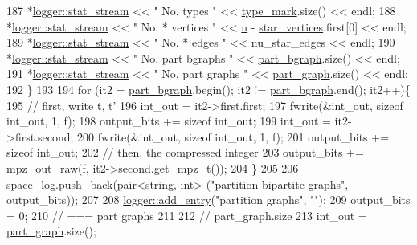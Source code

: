 \begin{DoxyCode}
187     *\hyperlink{classlogger_a7db37821f875f2ba3540980b355779f5}{logger::stat\_stream} << \textcolor{stringliteral}{" No. types         "} << 
      \hyperlink{classmarked__graph__compressed_a86b00223525703e973415cbc9c94da68}{type\_mark}.size() << endl;
188     *\hyperlink{classlogger_a7db37821f875f2ba3540980b355779f5}{logger::stat\_stream} << \textcolor{stringliteral}{" No. * vertices    "} << \hyperlink{classmarked__graph__compressed_a8d841016ddb11cfd33748c8deb6277ba}{n} - 
      \hyperlink{classmarked__graph__compressed_a7a4ced4586e2e353f9076bd447df5208}{star\_vertices}.first[0] << endl;
189     *\hyperlink{classlogger_a7db37821f875f2ba3540980b355779f5}{logger::stat\_stream} << \textcolor{stringliteral}{" No. * edges       "} << nu\_star\_edges << endl;
190     *\hyperlink{classlogger_a7db37821f875f2ba3540980b355779f5}{logger::stat\_stream} << \textcolor{stringliteral}{" No. part bgraphs  "} << 
      \hyperlink{classmarked__graph__compressed_a7b3267063fba30b45eb21b3ba4e07536}{part\_bgraph}.size() << endl;
191     *\hyperlink{classlogger_a7db37821f875f2ba3540980b355779f5}{logger::stat\_stream} << \textcolor{stringliteral}{" No. part graphs   "} << 
      \hyperlink{classmarked__graph__compressed_ae179a4737e6eab905c18a94d44ef64b7}{part\_graph}.size() << endl;
192   \}
193 
194   \textcolor{keywordflow}{for} (it2 = \hyperlink{classmarked__graph__compressed_a7b3267063fba30b45eb21b3ba4e07536}{part\_bgraph}.begin(); it2 != \hyperlink{classmarked__graph__compressed_a7b3267063fba30b45eb21b3ba4e07536}{part\_bgraph}.end(); it2++)\{
195     \textcolor{comment}{// first, write t, t'}
196     int\_out = it2->first.first;
197     fwrite(&int\_out, \textcolor{keyword}{sizeof} int\_out, 1, f);
198     output\_bits += \textcolor{keyword}{sizeof} int\_out;
199     int\_out = it2->first.second;
200     fwrite(&int\_out, \textcolor{keyword}{sizeof} int\_out, 1, f);
201     output\_bits += \textcolor{keyword}{sizeof} int\_out;
202     \textcolor{comment}{// then, the compressed integer}
203     output\_bits += mpz\_out\_raw(f, it2->second.get\_mpz\_t());
204   \}
205 
206   space\_log.push\_back(pair<string, int> (\textcolor{stringliteral}{"partition bipartite graphs"}, output\_bits));
207 
208   \hyperlink{classlogger_a710163deb17bc81f70d53d285b8ac9ac}{logger::add\_entry}(\textcolor{stringliteral}{"partition graphs"}, \textcolor{stringliteral}{""});
209   output\_bits = 0;
210   \textcolor{comment}{// === part graphs}
211 
212   \textcolor{comment}{// part\_graph.size}
213   int\_out = \hyperlink{classmarked__graph__compressed_ae179a4737e6eab905c18a94d44ef64b7}{part\_graph}.size();

\end{DoxyCode}
